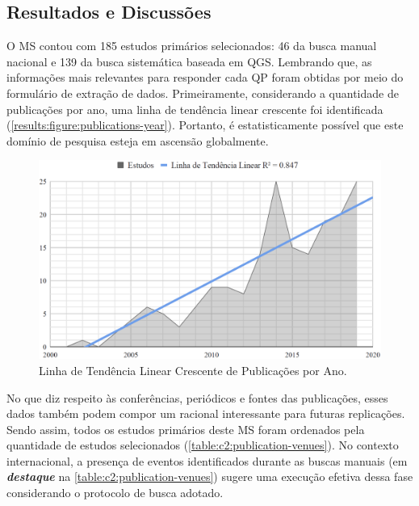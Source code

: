 \subsection{Resultados e Discussões}
\label{ms:resultados}

O MS contou com 185 estudos primários selecionados: 46 da busca manual nacional e 139 da busca sistemática baseada em QGS. Lembrando que, as informações mais relevantes para responder cada QP foram obtidas por meio do formulário de extração de dados. Primeiramente, considerando a quantidade de publicações por ano, uma linha de tendência linear crescente foi identificada (\autoref{results:figure:publications-year}). Portanto, é estatisticamente possível que este domínio de pesquisa esteja em ascensão globalmente.


\begin{figure}[htb]
\centering 
\caption{Linha de Tendência Linear Crescente de Publicações por Ano.}
\label{results:figure:publications-year}
\includegraphics[width=1\textwidth]{images/chapter2-sm-publications-timeline.png}
\fautor
\end{figure}


No que diz respeito às conferências, periódicos e fontes das publicações, esses dados também podem compor um racional interessante para futuras replicações. Sendo assim, todos os estudos primários deste MS foram ordenados pela quantidade de estudos selecionados (\autoref{table:c2:publication-venues}). No contexto internacional, a presença de eventos identificados durante as buscas manuais (em \textbf{\textit{destaque}} na \autoref{table:c2:publication-venues}) sugere uma execução efetiva dessa fase considerando o protocolo de busca adotado.

